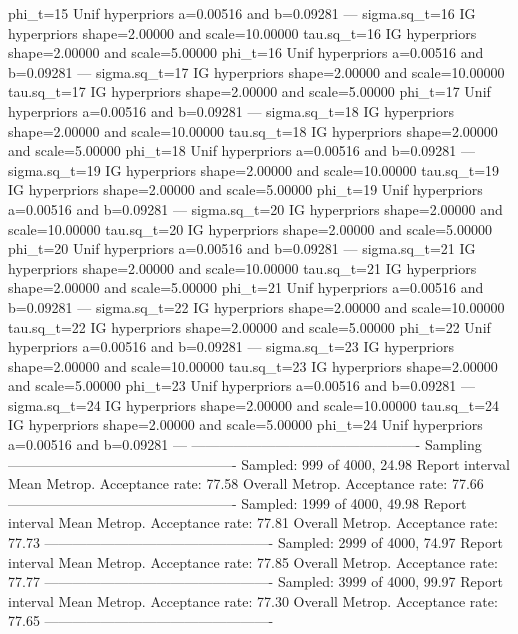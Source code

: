 \documentclass{article}
\begin{document}
\begin{Schunk}
\begin{Soutput}
	phi_t=15 Unif hyperpriors a=0.00516 and b=0.09281
	---
	sigma.sq_t=16 IG hyperpriors shape=2.00000 and scale=10.00000
	tau.sq_t=16 IG hyperpriors shape=2.00000 and scale=5.00000
	phi_t=16 Unif hyperpriors a=0.00516 and b=0.09281
	---
	sigma.sq_t=17 IG hyperpriors shape=2.00000 and scale=10.00000
	tau.sq_t=17 IG hyperpriors shape=2.00000 and scale=5.00000
	phi_t=17 Unif hyperpriors a=0.00516 and b=0.09281
	---
	sigma.sq_t=18 IG hyperpriors shape=2.00000 and scale=10.00000
	tau.sq_t=18 IG hyperpriors shape=2.00000 and scale=5.00000
	phi_t=18 Unif hyperpriors a=0.00516 and b=0.09281
	---
	sigma.sq_t=19 IG hyperpriors shape=2.00000 and scale=10.00000
	tau.sq_t=19 IG hyperpriors shape=2.00000 and scale=5.00000
	phi_t=19 Unif hyperpriors a=0.00516 and b=0.09281
	---
	sigma.sq_t=20 IG hyperpriors shape=2.00000 and scale=10.00000
	tau.sq_t=20 IG hyperpriors shape=2.00000 and scale=5.00000
	phi_t=20 Unif hyperpriors a=0.00516 and b=0.09281
	---
	sigma.sq_t=21 IG hyperpriors shape=2.00000 and scale=10.00000
	tau.sq_t=21 IG hyperpriors shape=2.00000 and scale=5.00000
	phi_t=21 Unif hyperpriors a=0.00516 and b=0.09281
	---
	sigma.sq_t=22 IG hyperpriors shape=2.00000 and scale=10.00000
	tau.sq_t=22 IG hyperpriors shape=2.00000 and scale=5.00000
	phi_t=22 Unif hyperpriors a=0.00516 and b=0.09281
	---
	sigma.sq_t=23 IG hyperpriors shape=2.00000 and scale=10.00000
	tau.sq_t=23 IG hyperpriors shape=2.00000 and scale=5.00000
	phi_t=23 Unif hyperpriors a=0.00516 and b=0.09281
	---
	sigma.sq_t=24 IG hyperpriors shape=2.00000 and scale=10.00000
	tau.sq_t=24 IG hyperpriors shape=2.00000 and scale=5.00000
	phi_t=24 Unif hyperpriors a=0.00516 and b=0.09281
	---
-------------------------------------------------
		Sampling
-------------------------------------------------
Sampled: 999 of 4000, 24.98%
Report interval Mean Metrop. Acceptance rate: 77.58%
Overall Metrop. Acceptance rate: 77.66%
-------------------------------------------------
Sampled: 1999 of 4000, 49.98%
Report interval Mean Metrop. Acceptance rate: 77.81%
Overall Metrop. Acceptance rate: 77.73%
-------------------------------------------------
Sampled: 2999 of 4000, 74.97%
Report interval Mean Metrop. Acceptance rate: 77.85%
Overall Metrop. Acceptance rate: 77.77%
-------------------------------------------------
Sampled: 3999 of 4000, 99.97%
Report interval Mean Metrop. Acceptance rate: 77.30%
Overall Metrop. Acceptance rate: 77.65%
-------------------------------------------------
\end{Soutput}
\end{Schunk}
\end{document}
